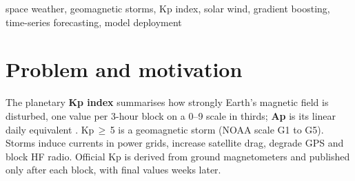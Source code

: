 \documentclass[conference,a4paper]{IEEEtran}
\begin{document}
\begin{abstract}
Geomagnetic storms disturb power grids, satellites, GPS and HF radio; their strength is measured by the
planetary Kp index (0--9). Tormenta has two parts. The \textbf{nowcaster} estimates the current hour's Kp from
solar-wind measurements taken about an hour upstream of Earth: from 8 raw inputs we build 66 causal features, compare
a persistence baseline with Linear Regression, KNN, SVR, Random Forest and HistGradientBoosting tuned by 5-fold
time-ordered cross-validation, and reach a test RMSE of 0.573 Kp ($R^2$ 0.808, 34\% below persistence) with a
calibrated 80\% prediction interval. The \textbf{forecaster} predicts daily Ap and daily maximum Kp for the next
7 days, plus the probability of a storm day. Its final model adds daily solar wind and coronal-hole areas measured on
one solar image per day; on the 2020--2026 test period it beats an index-only model (skill 0.122 vs 0.100, gain
significant on days 2--5) and is level with NOAA's official forecast. Both are deployed on Streamlit Community
Cloud, the Hugging Face Hub and a local Flask app, and every forecast is logged and scored daily.
\end{abstract}

\begin{IEEEkeywords}
space weather, geomagnetic storms, Kp index, solar wind, gradient boosting, time-series forecasting, model deployment
\end{IEEEkeywords}

\section{Problem and motivation}
The planetary \textbf{Kp index} summarises how strongly Earth's magnetic field is disturbed, one value per 3-hour
block on a 0--9 scale in thirds; \textbf{Ap} is its linear daily equivalent \cite{matzka2021}. Kp\,$\ge$\,5 is a
geomagnetic storm (NOAA scale G1 to G5). Storms induce currents in power grids, increase satellite drag, degrade GPS
and block HF radio. Official Kp is derived from ground magnetometers and published only after each block, with
final values weeks later.
\end{document}
